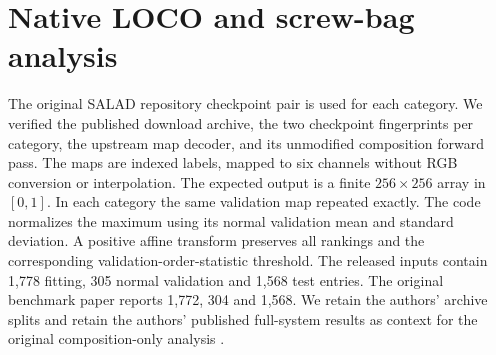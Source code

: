 \documentclass[10pt,twocolumn,letterpaper]{article}
\begin{document}
\begin{table}[t]
\centering
\caption{\textbf{Fixed photo halves for the matched photo edits.} Sham, Fault and Del. count alarms. All fault and deletion recalls are 100\% on the respective support. Bootstrap intervals for tied all-success contrasts are conditional on the sample.}
\label{tab:halves}
\scriptsize
\setlength{\tabcolsep}{3.3pt}

\end{table}

\section{Native LOCO and screw-bag analysis}
The original SALAD repository checkpoint pair is used for each category. We verified the published download archive, the two checkpoint fingerprints per category, the upstream map decoder, and its unmodified composition forward pass. The maps are indexed labels, mapped to six channels without RGB conversion or interpolation. The expected output is a finite $256\times256$ array in $[0,1]$. In each category the same validation map repeated exactly. The code normalizes the maximum using its normal validation mean and standard deviation. A positive affine transform preserves all rankings and the corresponding validation-order-statistic threshold. The released inputs contain 1,778 fitting, 305 normal validation and 1,568 test entries. The original benchmark paper reports 1,772, 304 and 1,568. We retain the authors' archive splits and retain the authors' published full-system results as context for the original composition-only analysis \cite{fucka2025}.

\begin{table}[t]
\centering
\caption{\textbf{Native map scores and composition branch alarms.} AUROC in percent. Pos/good counts positives and their eligible negative comparison images. Cutoffs come from normal validation only and stay fixed across scopes. Macro AUROC weights categories equally. Macro alarm counts add images. Pushpins has no eligible matched signature.}
\label{tab:locodetail}
\scriptsize
\setlength{\tabcolsep}{4pt}

\end{table}
\end{document}
